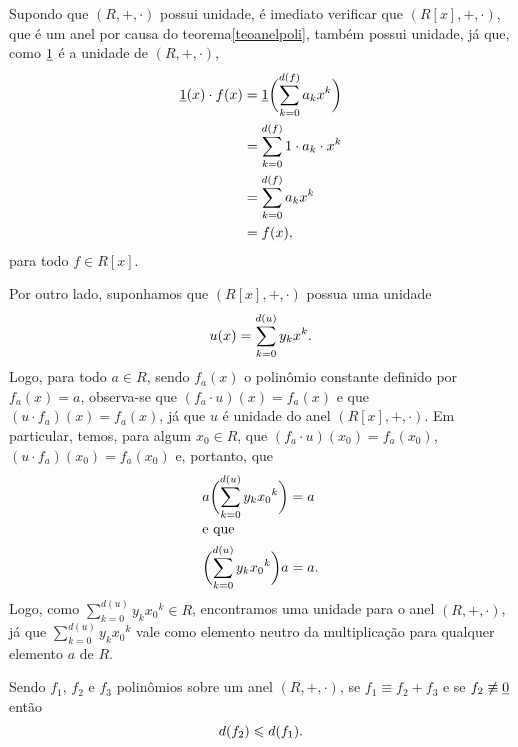 \begin{dem}
  Supondo que $(R,+,\cdot)$ possui unidade, é imediato verificar que
  $(R[x],+,\cdot)$, que é um anel por causa do
  teorema\xspace\ref{teoanelpoli},
  também possui unidade,
  já que, como $\underline{1}$ é a unidade de $(R,+,\cdot)$,
  \begin{equation*}
    \begin{aligned}
      \underline{1}(x)\cdot f(x) &= \underline{1}\biggl( \sum_{k=0}^{d(f)} a_kx^k \biggr)\\
                       &= \sum_{k=0}^{d(f)} 1\cdot a_k\cdot x^k \\
                       &= \sum_{k=0}^{d(f)} a_kx^k\\
                       &= f(x)\mathrm{,}
    \end{aligned}
  \end{equation*}
  para todo $f\in R[x]$.

  Por outro lado, suponhamos que $(R[x],+,\cdot)$ possua uma unidade
  \begin{equation*}
    u(x) = \sum_{k=0}^{d(u)}y_kx^k\mathrm{.}
  \end{equation*}
  Logo, para todo $a\in R$, sendo $f_a(x)$ o polinômio
  constante
  definido
  por $f_a(x)=a$, observa-se que $(f_a\cdot u)(x) = f_a(x)$ e que
  $(u\cdot f_a)(x) = f_a(x)$,
  já que $u$ é
  unidade do anel $(R[x],+,\cdot)$. Em particular, temos, para algum
  $x_0\in R$, que
  $(f_a\cdot u)(x_0) = f_a(x_0)$, $(u\cdot f_a)(x_0) = f_a(x_0)$
  e, portanto, que
  \begin{align*}
      a\biggl( \sum_{k=0}^{d(u)}y_k{x_0}^k \biggr) &= a \\
      \intertext{e que}
      \biggl( \sum_{k=0}^{d(u)}y_k{x_0}^k \biggr)a &= a\mathrm{.}
  \end{align*}
  Logo, como $\sum_{k=0}^{d(u)}y_k{x_0}^k\in R$, encontramos uma unidade
  para o anel $(R,+,\cdot)$, já que $\sum_{k=0}^{d(u)}y_k{x_0}^k$ vale
  como elemento neutro da multiplicação para qualquer elemento $a$ de
  $R$.
\end{dem}

\begin{Lem}\label{lemgraumais}
  Sendo $f_1$, $f_2$ e $f_3$ polinômios sobre um anel $(R,+,\cdot)$, se
  $f_1 \equiv f_2+f_3$ e se $f_2\not\equiv\underline{0}$
  então
  \begin{equation*}
    d(f_2)\leqslant d(f_1)\mathrm{.}
  \end{equation*}
\end{Lem}

